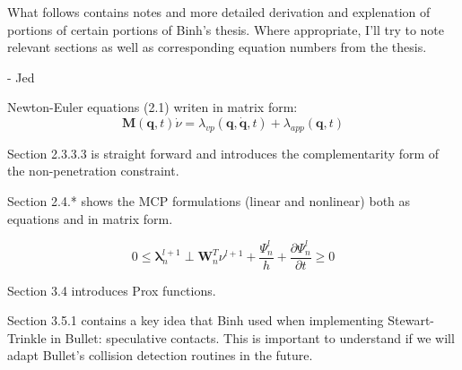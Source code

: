\documentclass{article}
\begin{document}
What follows contains notes and more detailed derivation and explenation of portions of certain portions of Binh's thesis.  Where appropriate, I'll try to note relevant sections as well as corresponding equation numbers from the thesis.  

\hspace{10cm} - Jed

Newton-Euler equations (2.1) writen in matrix form: \\
\begin{equation}
\mathbf{M}(\mathbf{q},t)\dot{\nu} = \lambda_{vp}(\mathbf{q},\dot{\mathbf{q}},t) + \lambda_{app}(\mathbf{q},t) \tag{2.27}
\end{equation}

Section 2.3.3.3 is straight forward and introduces the complementarity form of the non-penetration constraint.  

Section 2.4.* shows the MCP formulations (linear and nonlinear) both as equations and in matrix form.  

\begin{equation}
0 \leq \mathbf{\lambda}_n^{l+1} \perp \mathbf{W}_n^T \nu^{l+1} + \frac{\Psi_n^l}{h} + \frac{\partial \Psi_n^l}{\partial t} \geq 0 \tag{3.2}
\end{equation}

Section 3.4 introduces Prox functions.  

Section 3.5.1 contains a key idea that Binh used when implementing Stewart-Trinkle in Bullet: speculative contacts.  This is important to understand if we will adapt Bullet's collision detection routines in the future.  
\end{document}

